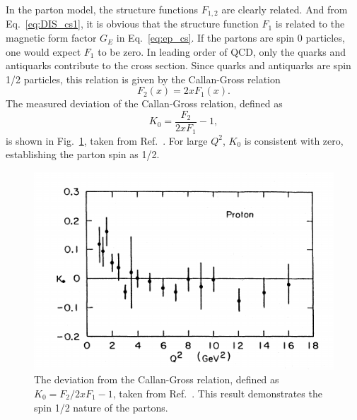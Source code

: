 In the parton model, the structure functions $F_{1,2}$ are clearly related. And
from Eq.\ \ref{eq:DIS_cs1}, it is obvious that the structure function $F_1$ is 
related to the magnetic form factor $G_E$ in Eq.\ \ref{eq:ep_cs}. If the partons
are spin 0 particles, one would expect $F_1$ to be zero. In leading order of QCD,
only the quarks and antiquarks contribute to the cross section. Since quarks and 
antiquarks are spin 1/2 particles, this relation is given by the Callan-Gross 
relation\cite{callan1968,callan1969}
\begin{equation}
F_2\left(x\right) = 2x F_1\left(x\right).
\end{equation}
The measured deviation of the Callan-Gross relation, defined as 
\begin{equation}
K_0 = \frac{F_2}{2xF_1}-1,
\end{equation}
is shown in Fig.\ \ref{fig:callan_gross}, taken from Ref.\ \cite{kendall1991}. 
For large $Q^2$, $K_0$ is consistent with zero, establishing the parton spin as
1/2.
\begin{figure}
\centering
\includegraphics[width=0.5\linewidth]{images/Callan_Gross_relation}
\caption{The deviation from the Callan-Gross relation, defined as 
	$K_0=F_2/2xF_1 -1$, taken from Ref.\ \cite{kendall1991}. This result
	demonstrates the spin 1/2 nature of the partons.}
\label{fig:callan_gross}
\end{figure}


